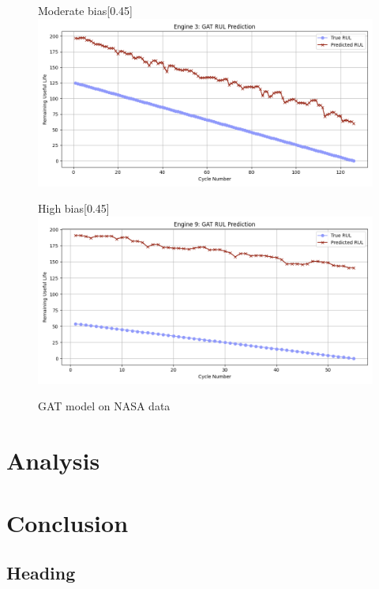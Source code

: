 \documentclass[12pt]{article}
\begin{document}
\begin{figure}[H]
    \begin{subcaptionbox}{Moderate bias\label{fig_NASA_GAT_eng2}}[0.45\textwidth]
        {\includegraphics[width=\linewidth]{figures/NASA/NASA_GAT_eng1.png}}
    \end{subcaptionbox}
    \hfill
    \begin{subcaptionbox}{High bias\label{fig_NASA_GAT_eng3}}[0.45\textwidth]
        {\includegraphics[width=\linewidth]{figures/NASA/NASA_GAT_eng3.png}}
    \end{subcaptionbox}

    \caption{GAT model on NASA data}
    \label{GAT_NASA_all}
\end{figure}


\pagebreak
\section{Analysis}

\pagebreak
\section{Conclusion}

\subsection{Heading}
\end{document}
